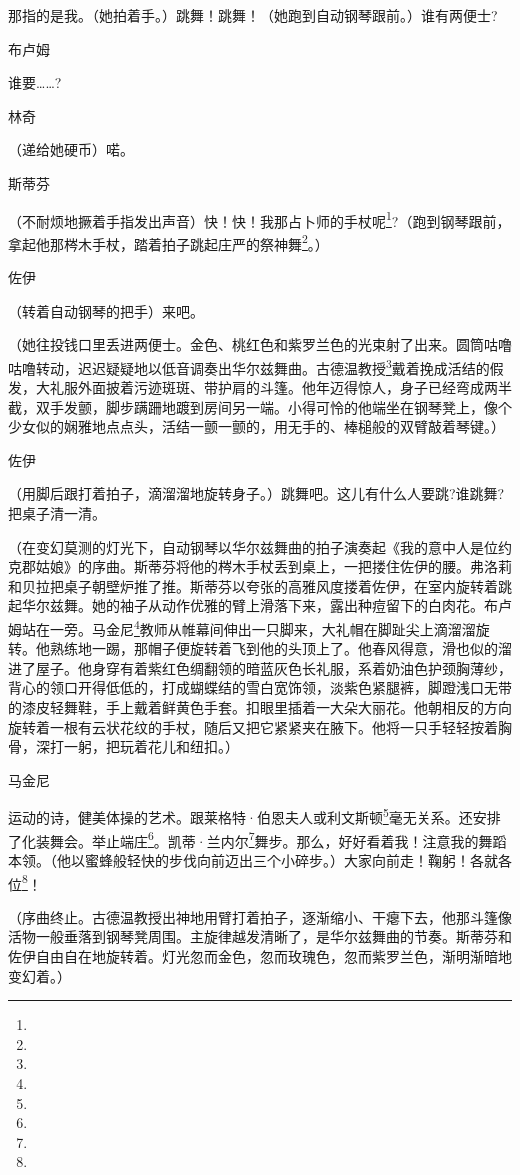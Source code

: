 \par 那指的是我。（她拍着手。）跳舞！跳舞！（她跑到自动钢琴跟前。）谁有两便士?
\par 布卢姆
\par 谁要……?
\par 林奇
\par （递给她硬币）喏。
\par 斯蒂芬
\par （不耐烦地撅着手指发出声音）快！快！我那占卜师的手杖呢\footnote{}?（跑到钢琴跟前，拿起他那梣木手杖，踏着拍子跳起庄严的祭神舞\footnote{}。）
\par 佐伊
\par （转着自动钢琴的把手）来吧。
\par （她往投钱口里丢进两便士。金色、桃红色和紫罗兰色的光束射了出来。圆筒咕噜咕噜转动，迟迟疑疑地以低音调奏出华尔兹舞曲。古德温教授\footnote{}戴着挽成活结的假发，大礼服外面披着污迹斑斑、带护肩的斗篷。他年迈得惊人，身子已经弯成两半截，双手发颤，脚步蹒跚地踱到房间另一端。小得可怜的他端坐在钢琴凳上，像个少女似的娴雅地点点头，活结一颤一颤的，用无手的、棒槌般的双臂敲着琴键。）
\par 佐伊
\par （用脚后跟打着拍子，滴溜溜地旋转身子。）跳舞吧。这儿有什么人要跳?谁跳舞?把桌子清一清。
\par （在变幻莫测的灯光下，自动钢琴以华尔兹舞曲的拍子演奏起《我的意中人是位约克郡姑娘》的序曲。斯蒂芬将他的梣木手杖丢到桌上，一把搂住佐伊的腰。弗洛莉和贝拉把桌子朝壁炉推了推。斯蒂芬以夸张的高雅风度搂着佐伊，在室内旋转着跳起华尔兹舞。她的袖子从动作优雅的臂上滑落下来，露出种痘留下的白肉花。布卢姆站在一旁。马金尼\footnote{}教师从帷幕间伸出一只脚来，大礼帽在脚趾尖上滴溜溜旋转。他熟练地一踢，那帽子便旋转着飞到他的头顶上了。他春风得意，滑也似的溜进了屋子。他身穿有着紫红色绸翻领的暗蓝灰色长礼服，系着奶油色护颈胸薄纱，背心的领口开得低低的，打成蝴蝶结的雪白宽饰领，淡紫色紧腿裤，脚蹬浅口无带的漆皮轻舞鞋，手上戴着鲜黄色手套。扣眼里插着一大朵大丽花。他朝相反的方向旋转着一根有云状花纹的手杖，随后又把它紧紧夹在腋下。他将一只手轻轻按着胸骨，深打一躬，把玩着花儿和纽扣。）
\par 马金尼
\par 运动的诗，健美体操的艺术。跟莱格特·伯恩夫人或利文斯顿\footnote{}毫无关系。还安排了化装舞会。举止端庄\footnote{}。凯蒂·兰内尔\footnote{}舞步。那么，好好看着我！注意我的舞蹈本领。（他以蜜蜂般轻快的步伐向前迈出三个小碎步。）大家向前走！鞠躬！各就各位\footnote{}！
\par （序曲终止。古德温教授出神地用臂打着拍子，逐渐缩小、干瘪下去，他那斗篷像活物一般垂落到钢琴凳周围。主旋律越发清晰了，是华尔兹舞曲的节奏。斯蒂芬和佐伊自由自在地旋转着。灯光忽而金色，忽而玫瑰色，忽而紫罗兰色，渐明渐暗地变幻着。）
